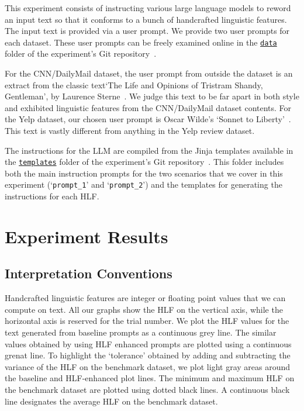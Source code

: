 \documentclass[runningheads,a4paper,11pt]{article}
\begin{document}
This experiment consists of instructing various large language models to reword
an input text so that it conforms to a bunch of handcrafted linguistic features.
The input text is provided via a user prompt.
We provide two user prompts for each dataset.
These user prompts can be freely examined online in the
\texttt{\href{https://github.com/koosie0507/llm-tst-consistency/tree/main/data}{data}}
folder of the experiment's Git repository~\cite{olar2024experimentcode}.

For the CNN/DailyMail dataset, the user prompt from outside the dataset is an
extract from the classic text`The Life and Opinions of Tristram Shandy,
Gentleman', by Laurence Sterne~\cite{sterne2003life}.
We judge this text to be far apart in both style and exhibited linguistic
features from the CNN/DailyMail dataset contents.
For the Yelp dataset, our chosen user prompt is Oscar Wilde's `Sonnet to
Liberty'~\cite{wilde1909poems}.
This text is vastly different from anything in the Yelp review dataset.

The instructions for the LLM are compiled from the Jinja templates available in
the \texttt{\href{https://github.com/koosie0507/llm-tst-consistency/tree/main/data}{templates}}
folder of the experiment's Git repository~\cite{olar2024experimentcode}.
This folder includes both the main instruction prompts for the two scenarios
that we cover in this experiment (`\texttt{prompt\_1}' and `\texttt{prompt\_2}')
and the templates for generating the instructions for each HLF.

\section{Experiment Results}

\subsection{Interpretation Conventions}

Handcrafted linguistic features are integer or floating point values that we
can compute on text.
All our graphs show the HLF on the vertical axis, while the horizontal axis is
reserved for the trial number.
We plot the HLF values for the text generated from baseline prompts as a
continuous grey line.
The similar values obtained by using HLF enhanced prompts are plotted using a
continuous grenat line.
To highlight the `tolerance' obtained by adding and subtracting the variance of
the HLF on the benchmark dataset, we plot light gray areas around the baseline
and HLF-enhanced plot lines.
The minimum and maximum HLF on the benchmark dataset are plotted using dotted
black lines.
A continuous black line designates the average HLF on the benchmark dataset.
\end{document}
